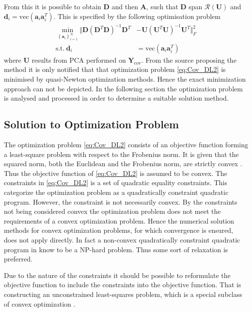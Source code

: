 From this it is possible to obtain $\mathbf{D}$ and then $\mathbf{A}$, such that $\mathbf{D}$ span $\mathcal{R}(\mathbf{U})$ and $\mathbf{d}_i = \text{vec}(\mathbf{a}_i \mathbf{a}_i^T)$. 
This is specified by the following optimisation problem \cite{Balkan2015}
\begin{align}
\min_{\left\{\mathbf{a}_i\right\}_{i = 1}^{N}}\Vert  \mathbf{D}(\mathbf{D}^T \mathbf{D})^{-1} \mathbf{D}^T &- \mathbf{U}(\mathbf{U}^T \mathbf{U})^{-1}\mathbf{U}^T \Vert_{F}^{2} \nonumber \\
\text{s.t.} \ \mathbf{d}_i &= \text{vec}(\mathbf{a}_i \mathbf{a}_i^T)\label{eq:Cov_DL2}
\end{align}      
where $\mathbf{U}$ results from PCA performed on $\textbf{Y}_{\text{cov}}$.
From the source \cite{Balkan2015} proposing the method it is only notified that that optimization problem \eqref{eq:Cov_DL2} is minimised by quasi-Newton optimization methods. Hence the exact minimization approach can not be depicted.    
In the following section the optimization problem is analysed and processed in order to determine a suitable solution method. 
 
\subsection{Solution to Optimization Problem}
The optimization problem \eqref{eq:Cov_DL2} consists of an objective function forming a least-square problem with respect to the Frobenius norm. It is given that the squared norm, both the Euclidean and the Frobenius norm, are strictly convex \cite[p.173]{norm_optimization}.
Thus the objective function of \eqref{eq:Cov_DL2} is assumed to be convex.
The constraints in \eqref{eq:Cov_DL2} is a set of quadratic equality constraints. 
This categorize the optimization problem as a quadratically constraint quadratic program. 
However, the constraint is not necessarily convex.  
By the constraints not being considered convex the optimization problem does not meet the requirements of a convex optimization problem. Hence the numerical solution methods for convex optimization problems, for which convergence is ensured, does not apply directly. In fact a non-convex quadratically constraint quadratic program in know to be a NP-hard problem\cite{qcqp}. Thus some sort of relaxation is preferred.  

Due to the nature of the constraints it should be possible to reformulate the objective function to include the constraints into the objective function. That is constructing an unconstrained least-squares problem, which is a special subclass of convex optimization \cite{cvxbook}.

